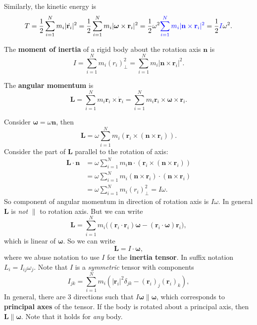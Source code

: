 Similarly, the kinetic energy is
\[
  T = \frac{1}{2}\sum_{i = 1}^N m_i|\dot{\mathbf{r}_i}|^2 =\frac{1}{2}\sum_{i = 1}^N m_i |\boldsymbol\omega\times \mathbf{r}_i|^2 = \frac{1}{2}\omega^2 {\color{blue}\sum_{i = 1}^N m_i  |\mathbf{n} \times \mathbf{r}_i|^2} = \frac{1}{2}{\color{blue}I}\omega^2.
\]
\begin{definition}
    The \textbf{moment of inertia} of a rigid body about the rotation axis $\mathbf{n}$ is
    \[
      I = \sum_{i = 1}^N m_i(r_i)_{\perp}^2 = \sum_{i = 1}^N m_i  |\mathbf{n} \times \mathbf{r}_i|^2.
    \]
\end{definition}
\begin{definition}
    The \textbf{angular momentum} is
    \[
      \mathbf{L} = \sum_{i=1}^N m_i \mathbf{r}_i \times \dot{\mathbf{r}}_i = \sum_{i=1}^N m_i \mathbf{r}_i \times \boldsymbol\omega \times \mathbf{r}_i.
    \]
\end{definition}

Consider $ \boldsymbol{\omega}=\omega \mathbf{n} $, then 
\[
    \mathbf{L} = \omega \sum_{i=1}^N m_i (\mathbf{r}_i \times (\mathbf{n} \times \mathbf{r}_i)).
\]
Consider the part of $ \mathbf{L} $ parallel to the rotation of axis: 
\begin{align*}
    \mathbf{L} \cdot \mathbf{n} &= \omega \sum_{i=1}^N m_i \mathbf{n}\cdot (\mathbf{r}_i \times (\mathbf{n} \times \mathbf{r}_i))\\
    &= \omega \sum_{i=1}^N m_i(\mathbf{n}\times \mathbf{r}_i)\cdot (\mathbf{n} \times \mathbf{r}_i)\\
    &= \omega \sum_{i=1}^{N}m_i(r_i)_{\perp}^2 = I\omega.
\end{align*}
So component of angular momentum in direction of rotation axis is $ I \omega $. In general $ \mathbf{L} $ is \textit{not} $\parallel$ to rotation axis. But we can write 
\[
  \mathbf{L} = \sum_{i=1}^N m_i\big((\mathbf{r}_i\cdot \mathbf{r}_i)\boldsymbol \omega - (\mathbf{r}_i \cdot \boldsymbol\omega)\mathbf{r}_i\big),
\]
which is linear of $\boldsymbol\omega$. So we can write
\[
  \mathbf{L} = I \cdot \boldsymbol \omega,
\]
where we abuse notation to use $I$ for the \textbf{inertia tensor}. In suffix notation $ L_i = I_{ij}\omega_j $. Note that $I$ is a \textit{symmetric} tensor with components
\[
  I_{jk} = \sum_{i=1}^N m_i(|\mathbf{r}_i|^2 \delta_{jk} - (\mathbf{r}_i)_j(\mathbf{r}_i)_k),
\]
In general, there are 3 directions such that $ I \boldsymbol{\omega} \parallel \boldsymbol{\omega} $, which corresponds to \textbf{principal axes} of the tensor. If the body is rotated about a principal axis, then $\mathbf{L}\parallel \boldsymbol\omega$. Note that it holds for \textit{any} body.

